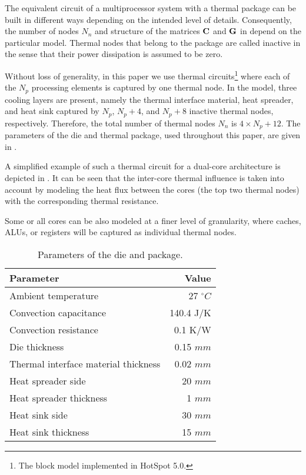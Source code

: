 The equivalent circuit of a multiprocessor system with a thermal package can be built in different ways depending on the intended level of details. Consequently, the number of nodes $N_n$ and structure of the matrices $\mathbf{C}$ and $\mathbf{G}$ in  depend on the particular model. Thermal nodes that belong to the package are called inactive in the sense that their power dissipation is assumed to be zero.

Without loss of generality, in this paper we use thermal circuits\footnote{The block model implemented in HotSpot \cite{huang2003} 5.0.} where each of the $N_p$ processing elements is captured by one thermal node. In the model, three cooling layers are present, namely the thermal interface material, heat spreader, and heat sink captured by $N_p$, $N_p + 4$, and $N_p + 8$ inactive thermal nodes, respectively. Therefore, the total number of thermal nodes $N_n$ is $4 \times N_p + 12$. The parameters of the die and thermal package, used throughout this paper, are given in .

A simplified example of such a thermal circuit for a dual-core architecture is depicted in . It can be seen that the inter-core thermal influence is taken into account by modeling the heat flux between the cores (the top two thermal nodes) with the corresponding thermal resistance.

Some or all cores can be also modeled at a finer level of granularity, where caches, ALUs, or registers will be captured as individual thermal nodes.
\begin{table}[b]
  \vspace{15pt}
  \caption{Parameters of the die and package.}
  \label{tab:parameters}
  \centering
  \begin{tabular}{|l|r|}
    \hline
    Parameter & Value \\
    \hline
    \hline
    Ambient temperature                   &   27 ${}^\circ C$ \\
    Convection capacitance                & 140.4 J/K \\
    Convection resistance                 & 0.1 K/W \\
    Die thickness                         & 0.15 $mm$ \\
    Thermal interface material thickness  & 0.02 $mm$ \\
    Heat spreader side                    &   20 $mm$ \\
    Heat spreader thickness               &    1 $mm$ \\
    Heat sink side                        &   30 $mm$ \\
    Heat sink thickness                   &   15 $mm$ \\
    \hline
  \end{tabular}
\end{table}
